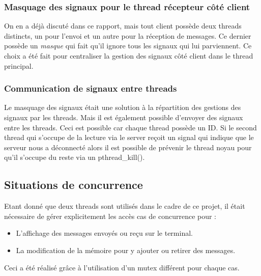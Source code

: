 \documentclass{article}
\begin{document}
\subsubsection*{Masquage des signaux pour le thread récepteur côté client}
 On en a déjà discuté dans ce rapport, mais tout client possède deux threads distincts, un pour l'envoi et un autre pour la réception de messages. Ce dernier possède un \textit{masque} qui fait qu'il ignore tous les signaux qui lui parviennent. Ce choix a été fait pour centraliser la gestion des signaux côté client dans le thread principal.

\subsubsection*{Communication de signaux entre threads}
Le masquage des signaux était une solution à la répartition des gestions des signaux par les threads. Mais il est également possible d'envoyer des signaux entre les threads. Ceci est possible car chaque thread possède un ID. Si le second thread qui s'occupe de la lecture via le server reçoit un signal qui indique que le serveur nous a déconnecté alors il est possible de prévenir le thread noyau pour qu'il s'occupe du reste via un pthread\_kill().



\subsection{Situations de concurrence}
Etant donné que deux threads sont utilisés dans le cadre de ce projet, il était nécessaire de gérer explicitement les accès cas de concurrence pour :
\begin{itemize}
    \item L'affichage des messages envoyés ou reçu sur le terminal.
    \item La modification de la mémoire pour y ajouter ou retirer des messages.
\end{itemize}
Ceci a été réalisé grâce à l'utilisation d'un mutex différent pour chaque cas.
\end{document}
